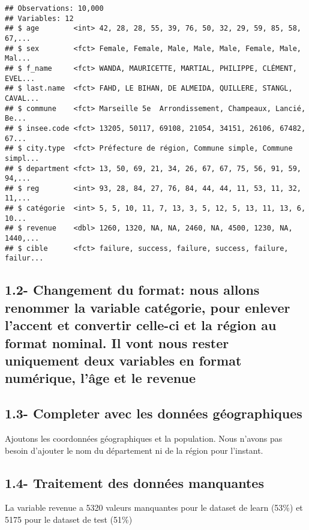 \documentclass[]{article}
\begin{document}
\begin{verbatim}
## Observations: 10,000
## Variables: 12
## $ age        <int> 42, 28, 28, 55, 39, 76, 50, 32, 29, 59, 85, 58, 67,...
## $ sex        <fct> Female, Female, Male, Male, Male, Female, Male, Mal...
## $ f_name     <fct> WANDA, MAURICETTE, MARTIAL, PHILIPPE, CLÉMENT, EVEL...
## $ last.name  <fct> FAHD, LE BIHAN, DE ALMEIDA, QUILLERE, STANGL, CAVAL...
## $ commune    <fct> Marseille 5e  Arrondissement, Champeaux, Lancié, Be...
## $ insee.code <fct> 13205, 50117, 69108, 21054, 34151, 26106, 67482, 67...
## $ city.type  <fct> Préfecture de région, Commune simple, Commune simpl...
## $ department <fct> 13, 50, 69, 21, 34, 26, 67, 67, 75, 56, 91, 59, 94,...
## $ reg        <int> 93, 28, 84, 27, 76, 84, 44, 44, 11, 53, 11, 32, 11,...
## $ catégorie  <int> 5, 5, 10, 11, 7, 13, 3, 5, 12, 5, 13, 11, 13, 6, 10...
## $ revenue    <dbl> 1260, 1320, NA, NA, 2460, NA, 4500, 1230, NA, 1440,...
## $ cible      <fct> failure, success, failure, success, failure, failur...
\end{verbatim}

\subsection{1.2- Changement du format: nous allons renommer la variable
catégorie, pour enlever l'accent et convertir celle-ci et la région au
format nominal. Il vont nous rester uniquement deux variables en format
numérique, l'âge et le
revenue}\label{changement-du-format-nous-allons-renommer-la-variable-categorie-pour-enlever-laccent-et-convertir-celle-ci-et-la-region-au-format-nominal.-il-vont-nous-rester-uniquement-deux-variables-en-format-numerique-lage-et-le-revenue}

\subsection{1.3- Completer avec les données
géographiques}\label{completer-avec-les-donnees-geographiques}

Ajoutons les coordonnées géographiques et la population. Nous n'avons
pas besoin d'ajouter le nom du département ni de la région pour
l'instant.

\subsection{1.4- Traitement des données
manquantes}\label{traitement-des-donnees-manquantes}

La variable revenue a 5320 valeurs manquantes pour le dataset de learn
(53\%) et 5175 pour le dataset de test (51\%)
\end{document}
